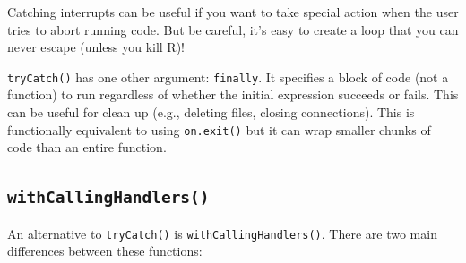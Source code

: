 Catching interrupts can be useful if you want to take special action
when the user tries to abort running code. But be careful, it's easy to
create a loop that you can never escape (unless you kill R)!

\begin{Shaded}
\begin{Highlighting}[]
\StringTok{ }
\StringTok{ }\NormalTok{) \{}
  \NormalTok{(\{}
    \NormalTok{(}\NormalTok{)}
    \NormalTok{(}\NormalTok{)}
  \NormalTok{\}, } 
    \NormalTok{(}\NormalTok{)}
    \StringTok{ }\StringTok{ }
  \NormalTok{\})}
\NormalTok{\}}
\end{Highlighting}
\end{Shaded}

\texttt{tryCatch()} has one other argument: \texttt{finally}. It
specifies a block of code (not a function) to run regardless of whether
the initial expression succeeds or fails. This can be useful for clean
up (e.g., deleting files, closing connections). This is functionally
equivalent to using \texttt{on.exit()} but it can wrap smaller chunks of
code than an entire function. 

\subsection{\texttt{withCallingHandlers()}}

An alternative to \texttt{tryCatch()} is \texttt{withCallingHandlers()}.
There are two main differences between these functions:

